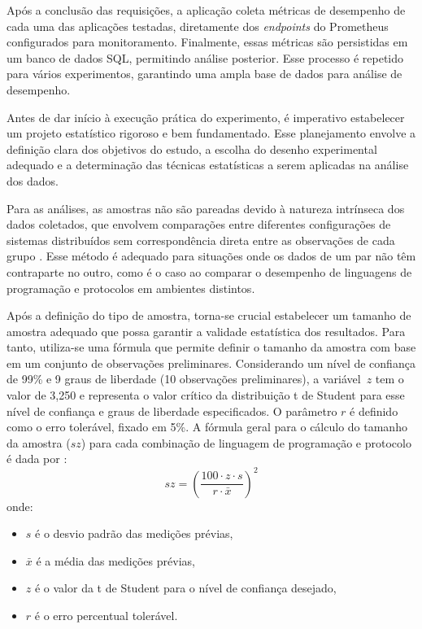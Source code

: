 Após a conclusão das requisições, a aplicação coleta métricas de desempenho de cada uma das aplicações testadas, diretamente dos \textit{endpoints} do Prometheus configurados para monitoramento.
Finalmente, essas métricas são persistidas em um banco de dados SQL, permitindo análise posterior.
Esse processo é repetido para vários experimentos, garantindo uma ampla base de dados para análise de desempenho. 

Antes de dar início à execução prática do experimento, é imperativo estabelecer um projeto estatístico rigoroso e bem fundamentado.
Esse planejamento envolve a definição clara dos objetivos do estudo, a escolha do desenho experimental adequado e a determinação das técnicas estatísticas a serem aplicadas na análise dos dados.

Para as análises, as amostras não são pareadas devido à natureza intrínseca dos dados coletados, que envolvem comparações entre diferentes configurações de sistemas distribuídos sem correspondência direta entre as observações de cada grupo \cite{Illowsky2017IntroductoryStatistics}.
Esse método é adequado para situações onde os dados de um par não têm contraparte no outro, como é o caso ao comparar o desempenho de linguagens de programação e protocolos em ambientes distintos. 

Após a definição do tipo de amostra, torna-se crucial estabelecer um tamanho de amostra adequado que possa garantir a validade estatística dos resultados.
Para tanto, utiliza-se uma fórmula que permite definir o tamanho da amostra com base em um conjunto de observações preliminares.
Considerando um nível de confiança de 99\% e 9 graus de liberdade (10 observações preliminares), a variável~\(z\) tem o valor de 3,250 e representa o valor crítico da distribuição t de Student para esse nível de confiança e graus de liberdade especificados. O parâmetro \(r\) é definido como o erro tolerável, fixado em 5\%. A fórmula geral para o cálculo do tamanho da amostra (\(sz\)) para cada combinação de linguagem de programação e protocolo é dada por \cite{jain1991art}:
\[
sz = \left( \frac{100 \cdot z \cdot s}{r \cdot \bar{x}} \right)^2

\]
onde:
\begin{itemize}
    \item \(s\) é o desvio padrão das medições prévias,
    \item \(\bar{x}\) é a média das medições prévias,
    \item \(z\) é o valor da t de Student para o nível de confiança desejado,
    \item \(r\) é o erro percentual tolerável.
\end{itemize}

